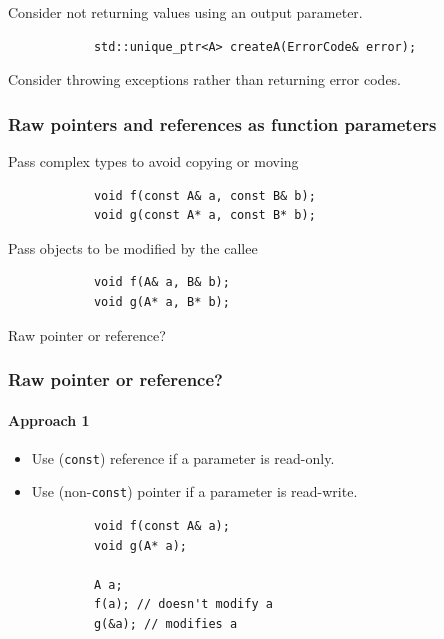 \documentclass{beamer}
\begin{document}
\begin{frame}[fragile]
	Consider not returning values using an output parameter.
	\begin{example}
		\begin{lstlisting}
			std::unique_ptr<A> createA(ErrorCode& error);
		\end{lstlisting}	
	\end{example}
    \pause
	Consider throwing exceptions rather than returning error codes.
\end{frame}


\begin{frame}[fragile]
\frametitle{Raw pointers and references as function parameters}
    \pause
    Pass complex types to avoid copying or moving
    \begin{example}
        \begin{lstlisting}
            void f(const A& a, const B& b);
            void g(const A* a, const B* b);
        \end{lstlisting}
    \end{example}
    \pause
    Pass objects to be modified by the callee
    \begin{example}
        \begin{lstlisting}
            void f(A& a, B& b);
            void g(A* a, B* b);
        \end{lstlisting}
    \end{example}
\end{frame}

\begin{frame}
    \begin{center}
    Raw pointer or reference?
    \end{center}
\end{frame}

\begin{frame}[fragile]
\frametitle{Raw pointer or reference?}
\framesubtitle{Approach 1}
    \begin{itemize}
    \item Use (\texttt{const}) reference if a parameter is read-only.
    \item Use (non-\texttt{const}) pointer if a parameter is read-write.
    \end{itemize}
    \begin{example}
        \begin{lstlisting}
            void f(const A& a);
            void g(A* a);

            A a;
            f(a); // doesn't modify a
            g(&a); // modifies a
        \end{lstlisting}
    \end{example}
\end{frame}
\end{document}
